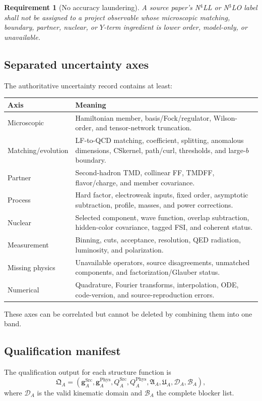 \documentclass[11pt]{article}
\newtheorem{requirement}[definition]{Requirement}
\newcommand{\CS}{\ensuremath{\mathrm{CS}}}
\newcommand{\Src}{\ensuremath{\mathrm{Src}}}
\newcommand{\Phys}{\ensuremath{\mathrm{Phys}}}
\begin{document}
\begin{requirement}[No accuracy laundering]
A source paper's N\(^4\)LL or N\(^3\)LO label shall not be assigned to a project observable whose microscopic matching, boundary, partner, nuclear, or \(Y\)-term ingredient is lower order, model-only, or unavailable.
\end{requirement}

\subsection{Separated uncertainty axes}

The authoritative uncertainty record contains at least:
\begin{longtable}{L{0.31\textwidth}L{0.61\textwidth}}
\toprule
Axis & Meaning\\
\midrule
\endhead
Microscopic & Hamiltonian member, basis/Fock/regulator, Wilson-order, and tensor-network truncation.\\
Matching/evolution & LF-to-QCD matching, coefficient, splitting, anomalous dimensions, \CS kernel, path/curl, thresholds, and large-\(b\) boundary.\\
Partner & Second-hadron TMD, collinear FF, TMDFF, flavor/charge, and member covariance.\\
Process & Hard factor, electroweak inputs, fixed order, asymptotic subtraction, profile, masses, and power corrections.\\
Nuclear & Selected component, wave function, overlap subtraction, hidden-color covariance, tagged FSI, and coherent status.\\
Measurement & Binning, cuts, acceptance, resolution, QED radiation, luminosity, and polarization.\\
Missing physics & Unavailable operators, source disagreements, unmatched components, and factorization/Glauber status.\\
Numerical & Quadrature, Fourier transforms, interpolation, ODE, code-version, and source-reproduction errors.\\
\bottomrule
\end{longtable}

These axes can be correlated but cannot be deleted by combining them into one band.

\subsection{Qualification manifest}

The qualification output for each structure function is
\begin{equation}
 \mathfrak Q_A
 =
 \left(
 \bm g_A^{\Src},
 \bm g_A^{\Phys},
 Q_A^{\Src},
 Q_A^{\Phys},
 \mathfrak A_A,
 \mathfrak U_A,
 \mathcal D_A,
 \mathcal B_A
 \right),
 \label{eq:qualification-manifest}
\end{equation}
where \(\mathcal D_A\) is the valid kinematic domain and \(\mathcal B_A\) the complete blocker list.
\end{document}
